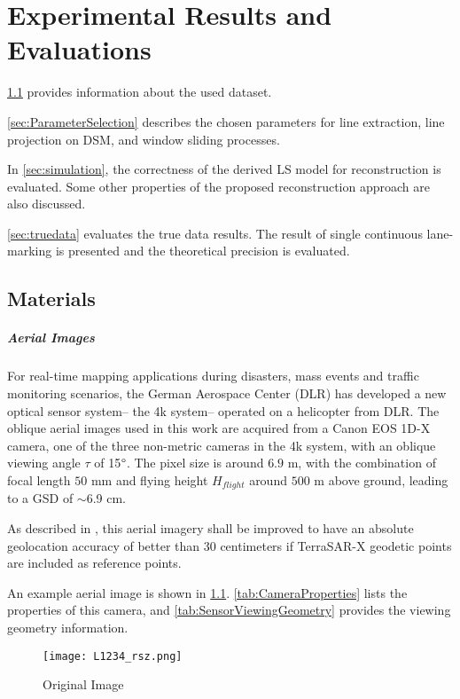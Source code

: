 \chapter{Experimental Results and Evaluations}
\label{chap:k3}

\cref{sec:Materials} provides information about the used dataset. 

\cref{sec:ParameterSelection} describes the chosen parameters for line extraction, line projection on DSM, and window sliding processes.

In \cref{sec:simulation}, the correctness of the derived LS model for reconstruction is evaluated. Some other properties of the proposed reconstruction approach are also discussed.

\cref{sec:truedata} evaluates the true data results. The result of single continuous lane-marking is presented and the theoretical precision is evaluated.

\clearpage
\section{Materials}
\label{sec:Materials}

\paragraph{Aerial Images}
For real-time mapping applications during disasters, mass events and traffic monitoring scenarios, the German Aerospace Center (DLR) has developed a new optical sensor system-- the 4k system-- operated on a helicopter from DLR. The oblique aerial images used in this work are acquired from a Canon EOS 1D-X camera, one of the three non-metric cameras in the 4k system, with an oblique viewing angle $\tau$ of 15$\degree$. The pixel size is around $6.9$ \textmu m, with the combination of focal length $50$ mm and flying height $H_{flight}$ around $500$ m above ground, leading to a GSD of $\sim$6.9 cm.

As described in \cite{Fischer2017}, this aerial imagery shall be improved to have an absolute geolocation accuracy of better than 30 centimeters if TerraSAR-X geodetic points are included as reference points.

An example aerial image is shown in \cref{fig:OriImg}. \cref{tab:CameraProperties} lists the properties of this camera, and \cref{tab:SensorViewingGeometry} provides the viewing geometry information.
\begin{figure}
	\centering
	\texttt{[image: L1234\_rsz.png]}
	\caption{\small Original Image}
	\label{fig:OriImg}
\end{figure}

